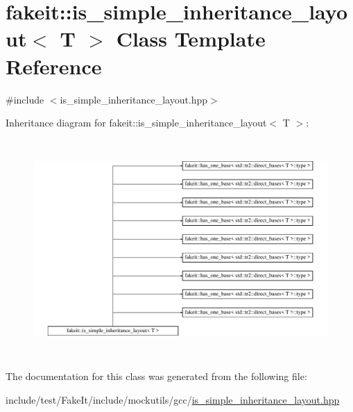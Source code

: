 \hypertarget{classfakeit_1_1is__simple__inheritance__layout}{}\section{fakeit\+::is\+\_\+simple\+\_\+inheritance\+\_\+layout$<$ T $>$ Class Template Reference}
\label{classfakeit_1_1is__simple__inheritance__layout}


{\ttfamily \#include $<$is\+\_\+simple\+\_\+inheritance\+\_\+layout.\+hpp$>$}

Inheritance diagram for fakeit\+::is\+\_\+simple\+\_\+inheritance\+\_\+layout$<$ T $>$\+:\begin{figure}[H]
\begin{center}
\leavevmode
\includegraphics[height=8.284024cm]{classfakeit_1_1is__simple__inheritance__layout}
\end{center}
\end{figure}


The documentation for this class was generated from the following file\+:\begin{DoxyCompactItemize}
\item 
include/test/\+Fake\+It/include/mockutils/gcc/\mbox{\hyperlink{is__simple__inheritance__layout_8hpp}{is\+\_\+simple\+\_\+inheritance\+\_\+layout.\+hpp}}\end{DoxyCompactItemize}
